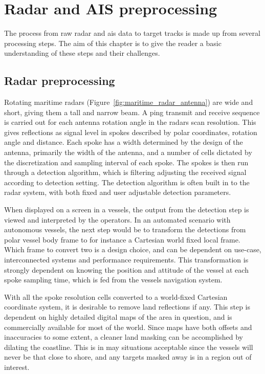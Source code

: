 
\chapter{Radar and AIS preprocessing}\label{chapter:radar-and-ais-preprocessing}
The process from raw radar and \gls{ais} data to target tracks is made up from several processing steps. The aim of this chapter is to give the reader a basic understanding of these steps and their challenges.

\section{Radar preprocessing}
Rotating maritime radars (Figure~\ref{fig:maritime_radar_antenna}) are wide and short, giving them a tall and narrow beam. A ping transmit and receive sequence is carried out for each antenna rotation angle in the radars scan resolution. This gives reflections as signal level in spokes described by polar coordinates, rotation angle and distance. Each spoke has a width determined by the design of the antenna, primarily the width of the antenna, and a number of cells dictated by the discretization and sampling interval of each spoke. The spokes is then run through a detection algorithm, which is filtering adjusting the received signal according to detection setting. The detection algorithm is often built in to the radar system, with both fixed and user adjustable detection parameters.

When displayed on a screen in a vessels, the output from the detection step is viewed and interpreted by the operators. In an automated scenario with autonomous vessels, the next step would be to transform the detections from polar vessel body frame to for instance a Cartesian world fixed local frame. Which frame to convert two is a design choice, and can be dependent on use-case, interconnected systems and performance requirements. This transformation is strongly dependent on knowing the position and attitude of the vessel at each spoke sampling time, which is fed from the vessels navigation system.

With all the spoke resolution cells converted to a world-fixed Cartesian coordinate system, it is desirable to remove land reflections if any. This step is dependent on highly detailed digital maps of the area in question, and is commercially available for most of the world. Since maps have both offsets and inaccuracies to some extent, a cleaner land masking can be accomplished by dilating the coastline. This is in may situations acceptable since the vessels will never be that close to shore, and any targets masked away is in a region out of interest.


